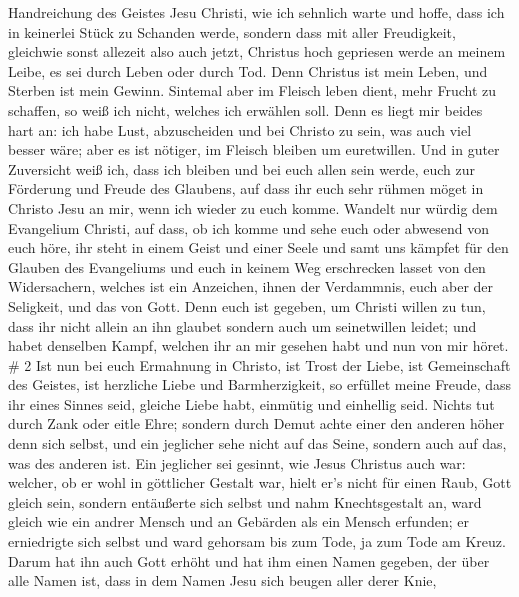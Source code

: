 Handreichung des Geistes Jesu Christi,  wie ich sehnlich
warte und hoffe, dass ich in keinerlei Stück zu Schanden werde, sondern
dass mit aller Freudigkeit, gleichwie sonst allezeit also auch jetzt,
Christus hoch gepriesen werde an meinem Leibe, es sei durch Leben oder
durch Tod.  Denn Christus ist mein Leben, und Sterben ist
mein Gewinn.  Sintemal aber im Fleisch leben dient, mehr
Frucht zu schaffen, so weiß ich nicht, welches ich erwählen soll.
 Denn es liegt mir beides hart an: ich habe Lust,
abzuscheiden und bei Christo zu sein, was auch viel besser wäre;
 aber es ist nötiger, im Fleisch bleiben um euretwillen.
 Und in guter Zuversicht weiß ich, dass ich bleiben und bei
euch allen sein werde, euch zur Förderung und Freude des Glaubens,
 auf dass ihr euch sehr rühmen möget in Christo Jesu an
mir, wenn ich wieder zu euch komme.  Wandelt nur würdig dem
Evangelium Christi, auf dass, ob ich komme und sehe euch oder abwesend
von euch höre, ihr steht in einem Geist und einer Seele und samt uns
kämpfet für den Glauben des Evangeliums  und euch in keinem
Weg erschrecken lasset von den Widersachern, welches ist ein Anzeichen,
ihnen der Verdammnis, euch aber der Seligkeit, und das von Gott.
 Denn euch ist gegeben, um Christi willen zu tun, dass ihr
nicht allein an ihn glaubet sondern auch um seinetwillen leidet;
 und habet denselben Kampf, welchen ihr an mir gesehen habt
und nun von mir höret. \# 2  Ist nun bei euch Ermahnung in
Christo, ist Trost der Liebe, ist Gemeinschaft des Geistes, ist
herzliche Liebe und Barmherzigkeit,  so erfüllet meine
Freude, dass ihr eines Sinnes seid, gleiche Liebe habt, einmütig und
einhellig seid.  Nichts tut durch Zank oder eitle Ehre;
sondern durch Demut achte einer den anderen höher denn sich selbst,
 und ein jeglicher sehe nicht auf das Seine, sondern auch
auf das, was des anderen ist.  Ein jeglicher sei gesinnt,
wie Jesus Christus auch war:  welcher, ob er wohl in
göttlicher Gestalt war, hielt er's nicht für einen Raub, Gott gleich
sein,  sondern entäußerte sich selbst und nahm
Knechtsgestalt an, ward gleich wie ein andrer Mensch und an Gebärden als
ein Mensch erfunden;  er erniedrigte sich selbst und ward
gehorsam bis zum Tode, ja zum Tode am Kreuz.  Darum hat ihn
auch Gott erhöht und hat ihm einen Namen gegeben, der über alle Namen
ist,  dass in dem Namen Jesu sich beugen aller derer Knie,
